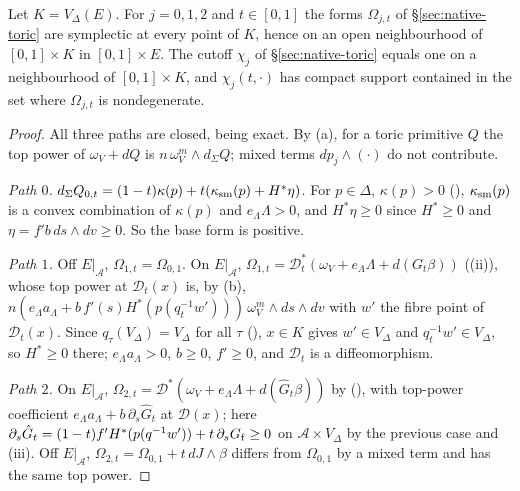 \begin{lemma}\label{lem:shd-nbhd}
Let $K=V_\Delta(E)$. For $j=0,1,2$ and $t\in[0,1]$ the forms $\Omega_{j,t}$ of \S\ref{sec:native-toric} are symplectic at every
point of $K$, hence on an open neighbourhood of $[0,1]\times K$ in $[0,1]\times E$. The cutoff $\chi_j$ of
\S\ref{sec:native-toric} equals one on a neighbourhood of $[0,1]\times K$, and $\chi_j(t,\cdot)$ has compact support contained in
the set where $\Omega_{j,t}$ is nondegenerate.
\end{lemma}
\begin{proof}
All three paths are closed, being exact. By (a), for a toric primitive $Q$ the top power of
$\omega_V+dQ$ is $n\,\omega_V^m\wedge d_\Sigma Q$; mixed terms $dp_j\wedge(\cdot)$ do not contribute.

\emph{Path $0$.} $d_\Sigma Q_{0,t}=(1-t)\kappa(p)+t(\kappa_{\rm sm}(p)+H^*\eta)$. For $p\in\Delta$, $\kappa(p)>0$
(), $\kappa_{\rm sm}(p)$ is a convex combination of $\kappa(p)$ and $e_\Lambda\Lambda>0$, and
$H^*\eta\ge0$ since $H^*\ge0$ and $\eta=f'b\,ds\wedge dv\ge0$. So the base form is positive.

\emph{Path $1$.} Off $E|_{\mathcal A}$, $\Omega_{1,t}=\Omega_{0,1}$. On $E|_{\mathcal A}$, $\Omega_{1,t}=\mathcal D_t^*(\omega_V+e_\Lambda\Lambda+d(G_t\beta))$
((ii)), whose top power at $\mathcal D_t(x)$ is, by (b),
$n(e_\Lambda a_\Lambda+b\,f'(s)H^*(p(q_t^{-1}w')))\,\omega_V^m\wedge ds\wedge dv$ with $w'$ the fibre point of $\mathcal D_t(x)$.
Since $q_\tau(V_\Delta)=V_\Delta$ for all $\tau$ (), $x\in K$ gives $w'\in V_\Delta$ and
$q_t^{-1}w'\in V_\Delta$, so $H^*\ge0$ there; $e_\Lambda a_\Lambda>0$, $b\ge0$, $f'\ge0$, and $\mathcal D_t$ is a diffeomorphism.

\emph{Path $2$.} On $E|_{\mathcal A}$, $\Omega_{2,t}=\mathcal D^*(\omega_V+e_\Lambda\Lambda+d(\hat G_t\beta))$ by (),
with top-power coefficient $e_\Lambda a_\Lambda+b\,\partial_s\hat G_t$ at $\mathcal D(x)$; here
$\partial_s\hat G_t=(1-t)f'H^*(p(q^{-1}w'))+t\,\partial_sG_{\rm f}\ge0$ on $\mathcal A\times V_\Delta$ by the previous case and
(iii). Off $E|_{\mathcal A}$, $\Omega_{2,t}=\Omega_{0,1}+t\,dJ\wedge\beta$ differs from
$\Omega_{0,1}$ by a mixed term and has the same top power.


\end{proof}
